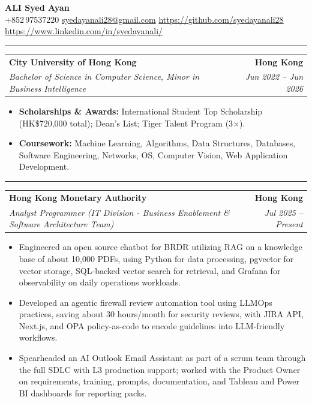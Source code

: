 \documentclass[9pt,a4paper]{article}
\makeatletter
\newcommand{\ressection}[1]{%
  \vspace{0.8em}%
  \noindent{\large\scshape\bfseries #1}\par\nobreak
  \vspace{-\parskip}%
  \vspace{-\parskip}%
  \vspace{-\parskip}%
  \vspace{-\parskip}%
  \noindent\rule{\linewidth}{0.1pt}\par\nobreak
  \vspace{-\parskip}%
}
\newcommand{\resumeSubheading}[4]{%
  \vspace{0.6em}%
  \begin{tabular*}{\textwidth}{l@{\extracolsep{\fill}}r}
    \textbf{#1} & \textbf{#2} \\
    \textit{\small #3} & \textit{\small #4} \\
  \end{tabular*}\vspace{0.32em}}
\makeatother
\begin{document}
\begin{center}
  {\LARGE\bfseries ALI Syed Ayan}\\[0.35em]
  \small
  +852\,97537220 \;\textbar\;
  \href{mailto:syedayanali28@gmail.com}{syedayanali28@gmail.com} \;\textbar\;
  \href{https://github.com/syedayanali28}{https://github.com/syedayanali28} \;\textbar\;
  \href{https://www.linkedin.com/in/syedayanali/}{https://www.linkedin.com/in/syedayanali/}
\end{center}
\vspace{0.55em}
\small

\ressection{Education}
\resumeSubheading{City University of Hong Kong}{Hong Kong}{Bachelor of Science in Computer Science, Minor in Business Intelligence}{Jun 2022 -- Jun 2026}
\begin{itemize}
  \item \textbf{Scholarships \& Awards:} International Student Top Scholarship (HK\$720{,}000 total); Dean's List; Tiger Talent Program (3$\times$).
  \item \textbf{Coursework:} Machine Learning, Algorithms, Data Structures, Databases, Software Engineering, Networks, OS, Computer Vision, Web Application Development.
\end{itemize}

\ressection{Work Experience}

\resumeSubheading{Hong Kong Monetary Authority}{Hong Kong}{Analyst Programmer (IT Division - Business Enablement \& Software Architecture Team)}{Jul 2025 -- Present}
\begin{itemize}
  \item Engineered an open source chatbot for BRDR utilizing RAG on a knowledge base of about 10{,}000 PDFs, using Python for data processing, pgvector for vector storage, SQL-backed vector search for retrieval, and Grafana for observability on daily operations workloads.
  \item Developed an agentic firewall review automation tool using LLMOps practices, saving about 30 hours/month for security reviews, with JIRA API, Next.js, and OPA policy-as-code to encode guidelines into LLM-friendly workflows.
  \item Spearheaded an AI Outlook Email Assistant as part of a scrum team through the full SDLC with L3 production support; worked with the Product Owner on requirements, training, prompts, documentation, and Tableau and Power BI dashboards for reporting packs.
\end{itemize}
\end{document}
